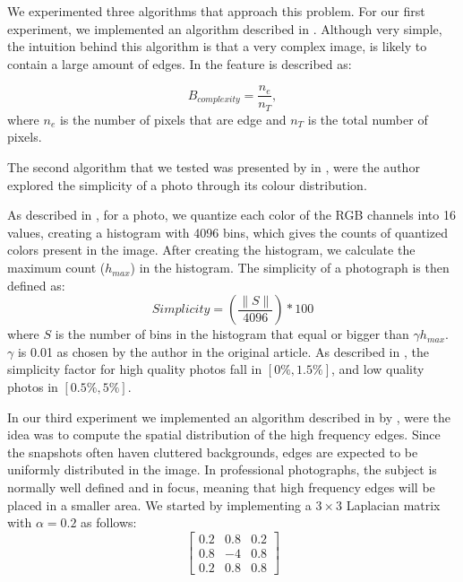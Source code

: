 We experimented three algorithms that approach this problem. For our first experiment, we implemented an algorithm described in \cite{kaoautomatic}. Although very simple, the intuition behind this algorithm is that a very complex image, is likely to contain a large amount of edges. In \cite{kaoautomatic} the feature is described as:

\begin{equation}
	B_{complexity} = \frac{n_{e}}{n_{T}},
\end{equation}
where $n_{e}$ is the number of pixels that are edge and $n_{T}$ is the total number of pixels.
 
 
The second algorithm that we tested was presented by \citeauthor{luo2008photo} in \cite{luo2008photo}, were the author explored the simplicity of a photo through its colour distribution.

As described in \cite{luo2008photo}, for a photo, we quantize each color of the RGB channels into 16 values, creating a histogram with 4096 bins, which gives the counts of quantized colors present in the image. After creating the histogram, we calculate the maximum count ($h_{max}$) in the histogram. The simplicity of a photograph is then defined as:
\begin{equation}
	Simplicity = \left(\frac{\|S\|}{4096}\right) * 100%
\end{equation}
where $S$ is the number of bins in the histogram that equal or bigger than $\gamma h_{max}$. $\gamma$ is 0.01 as chosen by the author in the original article. As described in \cite{luo2008photo}, the simplicity factor for high quality photos fall in $[0\%,1.5\%]$, and low quality photos in $[0.5\%,5\%]$.

In our third experiment we implemented an algorithm described in \cite{ke2006design} by \citeauthor{ke2006design}, were the idea was to compute the spatial distribution of the high frequency edges. Since the snapshots often haven cluttered backgrounds, edges are expected to be uniformly distributed in the image. In professional photographs, the subject is normally well defined and in focus, meaning that high frequency edges will be placed in a smaller area.
We started by implementing a $3\times3$ Laplacian matrix with $\alpha = 0.2$ as follows:
\begin{equation}
\begin{bmatrix}
  0.2 & 0.8 & 0.2 \\
  0.8 & -4 & 0.8 \\
  0.2 & 0.8 & 0.8
\end{bmatrix}
\end{equation}

